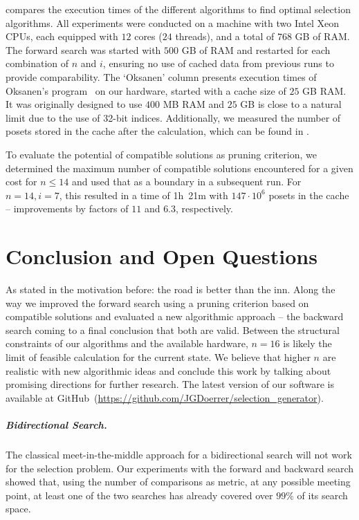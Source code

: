 \documentclass[a4paper,UKenglish,cleveref, autoref, thm-restate]{lipics-v2021}
\newcommand{\projectURL}[0]{https://github.com/JGDoerrer/selection_generator}
\newcommand{\projectServer}[0]{GitHub}
\begin{document}
 compares the execution times of the different algorithms to find optimal selection algorithms.
All experiments were conducted on a machine with two Intel Xeon CPUs, each equipped with $12$ cores ($24$ threads), and a total of $768$ GB of RAM.
The forward search was started with $500$ GB of RAM and restarted for each combination of $n$ and $i$, ensuring no use of cached data from previous runs to provide comparability.
The `Oksanen' column presents execution times of Oksanen's program~\cite{Oksanen} on our hardware, started with a cache size of $25$ GB RAM.
It was originally designed to use $400$ MB RAM and $25$ GB is close to a natural limit due to the use of 32-bit indices.
Additionally, we measured the number of posets stored in the cache after the calculation, which can be found in .

To evaluate the potential of compatible solutions as pruning criterion, we determined the maximum number of compatible solutions encountered for a given cost for $n \leq 14$ and used that as a boundary in a subsequent run.
For $n = 14, i = 7$, this resulted in a time of 1h~21m with $147 \cdot 10^6$ posets in the cache -- improvements by factors of $11$ and $6.3$, respectively.


\section{Conclusion and Open Questions}


As stated in the motivation before: the road is better than the inn.
Along the way we improved the forward search using a pruning criterion based on compatible solutions and evaluated a new algorithmic approach -- the backward search coming to a final conclusion that both are valid.
Between the structural constraints of our algorithms and the available hardware, $n=16$ is likely the limit of feasible calculation for the current state.
We believe that higher $n$ are realistic with new algorithmic ideas and conclude this work by talking about promising directions for further research.
The latest version of our software is available at \projectServer~(\url{\projectURL}).

\subparagraph{Bidirectional Search.}
The classical meet-in-the-middle approach for a bidirectional search will not work for the selection problem.
Our experiments with the forward and backward search showed that, using the number of comparisons as metric, at any possible meeting point, at least one of the two searches has already covered over $99\%$ of its search space.
\end{document}
